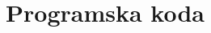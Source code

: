 \documentclass[a4paper,11pt]{article}
\begin{document}
\section{\label{app-code}Programska koda}






\end{document}
